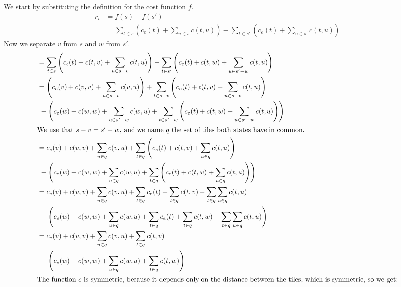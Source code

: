 We start by substituting the definition for the cost function $f$.
\begin{align*}
    r_i & = f(s) - f(s')                                                                                                                \\
        & = \sum_{t \in s} \left(c_e(t) + \sum_{u \in s} c(t,u) \right) - \sum_{t \in s'} \left(c_e(t) + \sum_{u \in s'} c(t,u) \right)
\end{align*}
Now we separate $v$ from $s$ and $w$ from $s'$.
\begin{align*}
     & = \sum_{t \in s} \left(c_e(t) + c(t,v) + \sum_{u \in s - v} c(t,u)\right) - \sum_{t \in s'} \left(c_e(t) + c(t,w) + \sum_{u \in s' - w} c(t,u) \right) \\
     & = \left(c_e(v) + c(v,v) + \sum_{u \in s - v} c(v,u)\right) + \sum_{t \in s - v} \left(c_e(t) + c(t,v) + \sum_{u \in s - v} c(t,u)\right)               \\
     & \ - \left(c_e(w) + c(w,w) + \sum_{u \in s' - w} c(w,u) + \sum_{t \in s' - w} \left(c_e(t) + c(t,w) + \sum_{u \in s' - w} c(t,u) \right) \right)        \\
    \intertext{We use that $s - v = s' - w$, and we name $q$ the set of tiles both states have in common.}
     & = c_e(v) + c(v,v) + \sum_{u \in q} c(v,u) + \sum_{t \in q} \left(c_e(t) + c(t,v) + \sum_{u \in q} c(t,u)\right)                                        \\
     & \ - \left(c_e(w) + c(w,w) + \sum_{u \in q} c(w,u) + \sum_{t \in q} \left(c_e(t) + c(t,w) + \sum_{u \in q} c(t,u) \right)\right)                        \\
     & = c_e(v) + c(v,v) + \sum_{u \in q} c(v,u) + \sum_{t \in q} c_e(t) + \sum_{t \in q} c(t,v) + \sum_{t \in q} \sum_{u \in q} c(t,u)                       \\
     & \ - \left(c_e(w) + c(w,w) + \sum_{u \in q} c(w,u) + \sum_{t \in q} c_e(t) + \sum_{t \in q} c(t,w) + \sum_{t \in q} \sum_{u \in q} c(t,u)\right)        \\
     & = c_e(v) + c(v,v) + \sum_{u \in q} c(v,u) +  \sum_{t \in q} c(t,v)                                                                                     \\
     & \ - \left(c_e(w) + c(w,w) + \sum_{u \in q} c(w,u) + \sum_{t \in q} c(t,w) \right)                                                                      \\
    \intertext{The function $c$ is symmetric, because it depends only on the distance between the tiles, which is symmetric, so we get:}

\end{align*}
